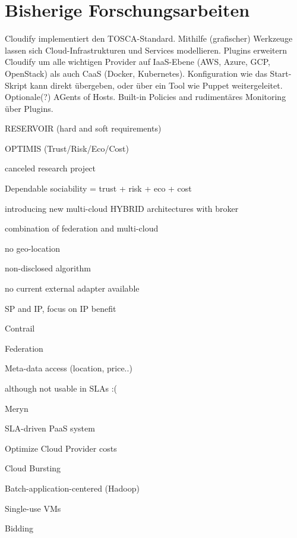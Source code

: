 
\section{Bisherige Forschungsarbeiten}



Cloudify implementiert den TOSCA-Standard. Mithilfe (grafischer) Werkzeuge lassen sich Cloud-Infrastrukturen und Services modellieren. Plugins erweitern Cloudify um alle wichtigen Provider auf IaaS-Ebene (AWS, Azure, GCP, OpenStack) als auch CaaS (Docker, Kubernetes). Konfiguration wie das Start-Skript kann direkt übergeben, oder über ein Tool wie Puppet weitergeleitet. Optionale(?) AGents of Hosts. Built-in Policies and rudimentäres Monitoring über Plugins.



RESERVOIR (hard and soft requirements) 



OPTIMIS (Trust/Risk/Eco/Cost) 

canceled research project 

Dependable sociability = trust + risk + eco + cost 

introducing new multi-cloud HYBRID architectures with broker 

combination of federation and multi-cloud 

no geo-location 

non-disclosed algorithm 

no current external adapter available 

SP and IP, focus on IP benefit 





Contrail 

Federation 

Meta-data access (location, price..) 

although not usable in SLAs  :( 



Meryn 

SLA-driven PaaS system 

Optimize Cloud Provider costs 

Cloud Bursting 

Batch-application-centered (Hadoop) 

Single-use VMs 

Bidding 



